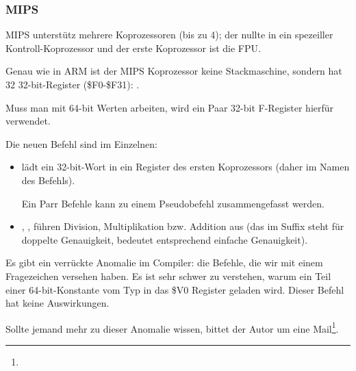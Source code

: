 \subsubsection{MIPS}

MIPS unterstütz mehrere Koprozessoren (bis zu 4); der nullte in ein spezeiller
Kontroll-Koprozessor und der erste Koprozessor ist die FPU.

Genau wie in ARM ist der MIPS Koprozessor keine Stackmaschine, sondern hat 32
32-bit-Register (\$F0-\$F31):
.

Muss man mit 64-bit \Tdouble Werten arbeiten, wird ein Paar 32-bit F-Register
hierfür verwendet.



Die neuen Befehl sind im Einzelnen:

\begin{itemize}

\item {} lädt ein 32-bit-Wort in ein Register des ersten Koprozessors
(daher  im Namen des Befehls).

Ein Parr  Befehle kann zu einem  Pseudobefehl zusammengefasst
werden.

\item {}, ,  führen Division, Multiplikation bzw.
Addition aus (das  im Suffix steht für doppelte Genauigkeit, 
bedeutet entsprechend einfache Genauigkeit).

\end{itemize}

\myindex{\CompilerAnomaly}
\label{MIPS_FPU_LUI}
Es gibt ein verrückte Anomalie im Compiler: die  Befehle, die wir mit
einem Fragezeichen versehen haben. 
Es ist sehr schwer zu verstehen, warum ein Teil einer
64-bit-Konstante vom Typ \Tdouble in das \$V0 Register geladen wird. 
Dieser Befehl hat keine Auswirkungen. 

Sollte jemand mehr zu dieser Anomalie wissen, bittet der Autor um eine
Mail\footnote{\EMAIL}.

